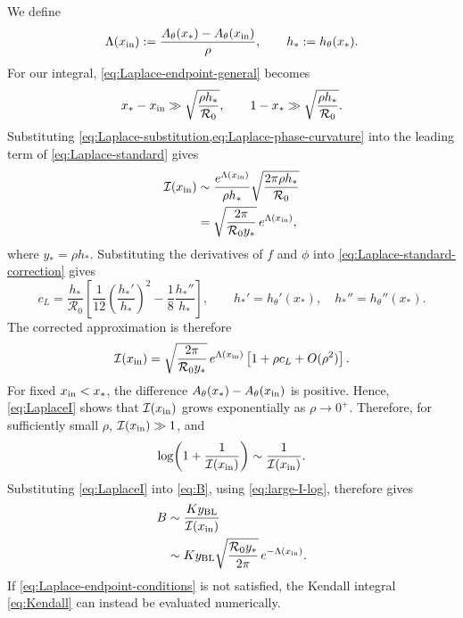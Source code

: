 \documentclass[11pt]{article}
\newcommand{\Rzero}{\mathcal R_0}
\newcommand{\rhoeps}{\rho}
\newcommand{\hth}{h_\theta}
\newcommand{\xs}{x_*}
\newcommand{\yin}{y_{\rm BL}}
\newcommand{\xin}{x_{\rm in}}
\newcommand{\Ath}{A_\theta}
\begin{document}
We define
\begin{equation}
\Lambda(\xin):=\frac{\Ath(\xs)-\Ath(\xin)}{\rhoeps},\qquad h_*:=\hth(\xs).
\label{eq:Lambda}
\end{equation}
For our integral, \cref{eq:Laplace-endpoint-general} becomes
\begin{equation}
\xs-\xin\gg\sqrt{\frac{\rhoeps h_*}{\Rzero}},\qquad
1-\xs\gg\sqrt{\frac{\rhoeps h_*}{\Rzero}}.
\label{eq:Laplace-endpoint-conditions}
\end{equation}
Substituting \cref{eq:Laplace-substitution,eq:Laplace-phase-curvature} into the leading term of \cref{eq:Laplace-standard} gives
\begin{equation}
\begin{aligned}
\mathcal{I}(\xin)&\sim
\frac{e^{\Lambda(\xin)}}{\rhoeps h_*}
\sqrt{\frac{2\pi\rhoeps h_*}{\Rzero}}\\
&=\sqrt{\frac{2\pi}{\Rzero y_*}}\,e^{\Lambda(\xin)},
\end{aligned}
\label{eq:LaplaceI}
\end{equation}
where \(y_*=\rhoeps h_*\).
Substituting the derivatives of \(f\) and \(\phi\) into \cref{eq:Laplace-standard-correction} gives
\begin{equation}
c_L=\frac{h_*}{\Rzero}
\left[
\frac{1}{12}\left(\frac{h_*'}{h_*}\right)^2
-\frac18\frac{h_*''}{h_*}
\right],\qquad
h_*'=\hth'(\xs),\quad h_*''=\hth''(\xs).
\label{eq:cL}
\end{equation}
The corrected approximation is therefore
\begin{equation}
\mathcal{I}(\xin)=
\sqrt{\frac{2\pi}{\Rzero y_*}}\,e^{\Lambda(\xin)}
\left[1+\rhoeps c_L+O(\rhoeps^2)\right].
\label{eq:LaplaceNext}
\end{equation}
For fixed \(\xin<\xs\), the difference \(\Ath(\xs)-\Ath(\xin)\) is positive. Hence, \cref{eq:LaplaceI} shows that \(\mathcal{I}(\xin)\) grows exponentially as \(\rhoeps\to0^+\). Therefore, for sufficiently small \(\rhoeps\), \(\mathcal{I}(\xin)\gg1\), and
\begin{equation}
\log\!\left(1+\frac1{\mathcal{I}(\xin)}\right)\sim\frac1{\mathcal{I}(\xin)}.
\label{eq:large-I-log}
\end{equation}
Substituting \cref{eq:LaplaceI} into \cref{eq:B}, using \cref{eq:large-I-log}, therefore gives
\begin{equation}
\begin{aligned}
B&\sim\frac{K\yin}{\mathcal{I}(\xin)}\\
&\sim K\yin\sqrt{\frac{\Rzero y_*}{2\pi}}\,e^{-\Lambda(\xin)}.
\end{aligned}
\label{eq:LaplaceB}
\end{equation}
If \cref{eq:Laplace-endpoint-conditions} is not satisfied, the Kendall integral \cref{eq:Kendall} can instead be evaluated numerically.
\end{document}
